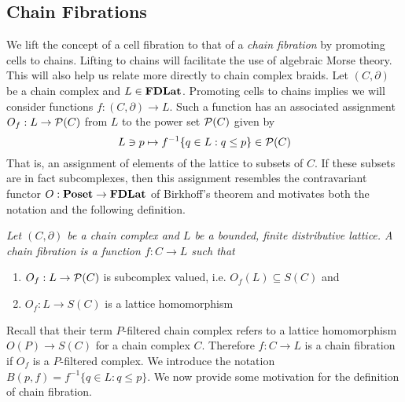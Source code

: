 \subsection{Chain Fibrations}

We lift the concept of a cell fibration to that of a {\em chain fibration} by promoting cells to chains.  Lifting to chains will facilitate the use of algebraic Morse theory.  This will also help us relate more directly to chain complex braids.  Let $(C,\partial)$ be a chain complex and $L\in {\bf FDLat}$.  Promoting cells to chains implies we will consider functions $f:(C,\partial)\to L$.  Such a function has an associated assignment  $O_f:L\to {\mathcal P}(C)$ from $L$ to the power set ${\mathcal P}(C)$ given by $$L\ni p\mapsto f^{-1}\{q\in L:q\leq p\}\in {\mathcal P}(C)$$  That is, an assignment of elements of the lattice to subsets of $C$.  If these subsets are in fact subcomplexes, then this assignment resembles the contravariant functor $O:{\bf Poset}\to {\bf FDLat}$ of Birkhoff's theorem and motivates both the notation and the following definition.  


\begin{defn}\label{def:}
{\em
Let $(C,\partial)$ be a chain complex and $L$ be a bounded, finite distributive lattice.  A {\em chain fibration} is a function $f:C\to L$ such that 
\begin{enumerate}
\item $O_f:L\to {\mathcal P}(C)$ is subcomplex valued, i.e. $O_f(L)\subseteq S(C)$ and 
\item $O_f:L\to S(C)$ is a lattice homomorphism
\end{enumerate}
}
\end{defn}


Recall that their term $P$-filtered chain complex refers to a lattice homomorphism $O(P)\to S(C)$ for a chain complex $C$.  Therefore $f:C\to L$ is a chain fibration if $O_f$ is a $P$-filtered complex.  We introduce the notation $B(p,f)=f^{-1}\{q\in L:q\leq p\}$.  We now provide some motivation for the definition of chain fibration.


